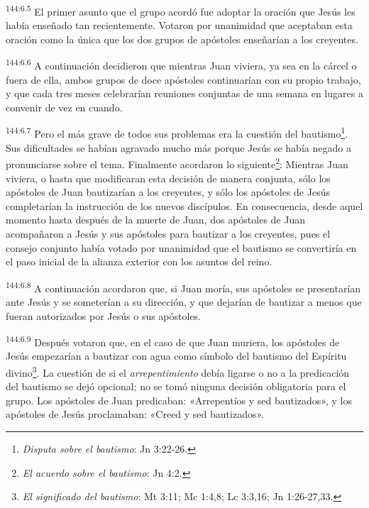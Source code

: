 \par
\textsuperscript{144:6.5} El primer asunto que el grupo acordó fue adoptar la oración que Jesús les había enseñado tan recientemente. Votaron por unanimidad que aceptaban esta oración como la única que los dos grupos de apóstoles enseñarían a los creyentes.

\par
\textsuperscript{144:6.6} A continuación decidieron que mientras Juan viviera, ya sea en la cárcel o fuera de ella, ambos grupos de doce apóstoles continuarían con su propio trabajo, y que cada tres meses celebrarían reuniones conjuntas de una semana en lugares a convenir de vez en cuando.

\par
\textsuperscript{144:6.7} Pero el más grave de todos sus problemas era la cuestión del bautismo\footnote{\textit{Disputa sobre el bautismo}: Jn 3:22-26.}. Sus dificultades se habían agravado mucho más porque Jesús se había negado a pronunciarse sobre el tema. Finalmente acordaron lo siguiente\footnote{\textit{El acuerdo sobre el bautismo}: Jn 4:2.}: Mientras Juan viviera, o hasta que modificaran esta decisión de manera conjunta, sólo los apóstoles de Juan bautizarían a los creyentes, y sólo los apóstoles de Jesús completarían la instrucción de los nuevos discípulos. En consecuencia, desde aquel momento hasta después de la muerte de Juan, dos apóstoles de Juan acompañaron a Jesús y sus apóstoles para bautizar a los creyentes, pues el consejo conjunto había votado por unanimidad que el bautismo se convertiría en el paso inicial de la alianza exterior con los asuntos del reino.

\par
\textsuperscript{144:6.8} A continuación acordaron que, si Juan moría, sus apóstoles se presentarían ante Jesús y se someterían a su dirección, y que dejarían de bautizar a menos que fueran autorizados por Jesús o sus apóstoles.

\par
\textsuperscript{144:6.9} Después votaron que, en el caso de que Juan muriera, los apóstoles de Jesús empezarían a bautizar con agua como símbolo del bautismo del Espíritu divino\footnote{\textit{El significado del bautismo}: Mt 3:11; Mc 1:4,8; Lc 3:3,16; Jn 1:26-27,33.}. La cuestión de si el \textit{arrepentimiento} debía ligarse o no a la predicación del bautismo se dejó opcional; no se tomó ninguna decisión obligatoria para el grupo. Los apóstoles de Juan predicaban: «Arrepentíos y sed bautizados», y los apóstoles de Jesús proclamaban: «Creed y sed bautizados».

